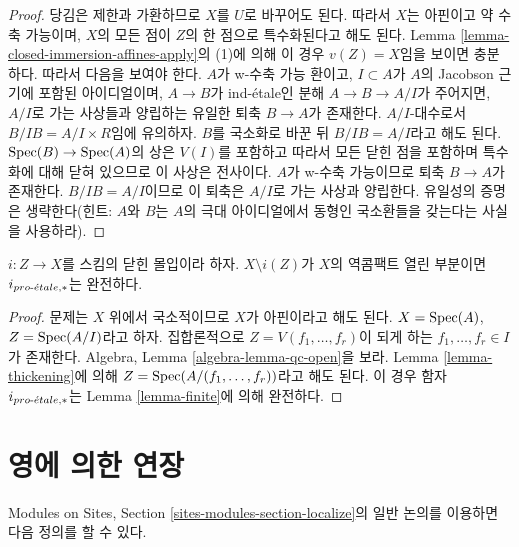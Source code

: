 \begin{proof}
당김은 제한과 가환하므로 $X$를 $U$로 바꾸어도 된다. 따라서 $X$는
아핀이고 약 수축 가능이며, $X$의 모든 점이 $Z$의 한 점으로
특수화된다고 해도 된다. Lemma
\ref{lemma-closed-immersion-affines-apply}의 (1)에 의해 이 경우
$v(Z) = X$임을 보이면 충분하다. 따라서 다음을 보여야 한다.
$A$가 w-수축 가능 환이고, $I \subset A$가 $A$의 Jacobson 근기에
포함된 아이디얼이며, $A \to B$가 ind-\'etale인 분해
$A \to B \to A/I$가 주어지면, $A/I$로 가는 사상들과 양립하는 유일한
퇴축 $B \to A$가 존재한다. $A/I$-대수로서
$B/IB = A/I \times R$임에 유의하자. $B$를 국소화로 바꾼 뒤
$B/IB = A/I$라고 해도 된다. $\mathop{\mathrm{Spec}}(B) \to \mathop{\mathrm{Spec}}(A)$의 상은 $V(I)$를
포함하고 따라서 모든 닫힌 점을 포함하며 특수화에 대해 닫혀 있으므로
이 사상은 전사이다. $A$가 w-수축 가능이므로 퇴축 $B \to A$가
존재한다. $B/IB = A/I$이므로 이 퇴축은 $A/I$로 가는 사상과
양립한다. 유일성의 증명은 생략한다(힌트: $A$와 $B$는 $A$의 극대
아이디얼에서 동형인 국소환들을 갖는다는 사실을 사용하라).
\end{proof}

\begin{lemma}
\label{lemma-closed-immersion-complement-retrocompact-exact}
$i : Z \to X$를 스킴의 닫힌 몰입이라 하자.
$X \setminus i(Z)$가 $X$의 역콤팩트 열린 부분이면
$i_{{pro\text{-}\acute{e}tale}, *}$는 완전하다.
\end{lemma}

\begin{proof}
문제는 $X$ 위에서 국소적이므로 $X$가 아핀이라고 해도 된다.
$X = \mathop{\mathrm{Spec}}(A)$, $Z = \mathop{\mathrm{Spec}}(A/I)$라고 하자. 집합론적으로
$Z = V(f_1, \ldots, f_r)$이 되게 하는
$f_1, \ldots, f_r \in I$가 존재한다. Algebra, Lemma
\ref{algebra-lemma-qc-open}을 보라. Lemma \ref{lemma-thickening}에 의해
$Z = \mathop{\mathrm{Spec}}(A/(f_1, \ldots, f_r))$라고 해도 된다. 이 경우 함자
$i_{{pro\text{-}\acute{e}tale}, *}$는 Lemma \ref{lemma-finite}에 의해 완전하다.
\end{proof}





\section{영에 의한 연장}
\label{section-extension-by-zero}

\noindent
Modules on Sites, Section \ref{sites-modules-section-localize}의 일반
논의를 이용하면 다음 정의를 할 수 있다.

